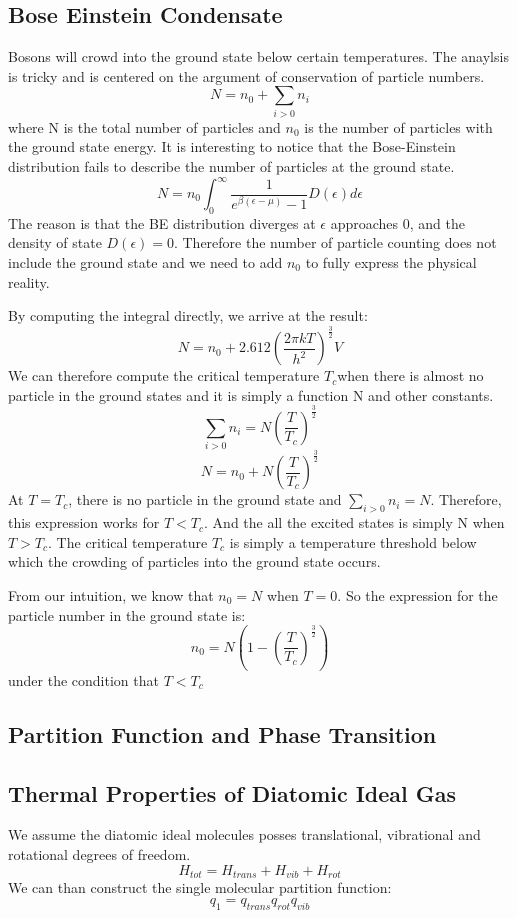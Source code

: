 \documentclass[12pt, oneside]{article}   	%
\begin{document}
\subsection{Bose Einstein Condensate}
\par 
Bosons will crowd into the ground state below certain temperatures. The anaylsis is tricky and is centered on the argument of conservation of particle numbers. 
$$N = n_0 + \sum_{i > 0} n_i $$
where N is the total number of particles and $n_0$ is the number of particles with the ground state energy. It is interesting to notice that the Bose-Einstein distribution fails to describe the number of particles at the ground state. 
$$N = n_0 \int_0^{\infty} \frac{1}{e^{\beta (\epsilon - \mu)} -1} D(\epsilon) d\epsilon$$
The reason is that the BE distribution diverges at $\epsilon$ approaches 0, and the density of state $D(\epsilon) = 0$. Therefore the number of particle counting does not include the ground state and we need to add $n_0$ to fully express the physical reality. 
\par 
By computing the integral directly, we arrive at the result: 
$$N = n_0 + 2.612 (\frac{2\pi k T}{h^2})^{\frac{3}{2}} V $$
We can therefore compute the critical temperature $T_c$when there is almost no particle in the ground states and it is simply a function N and other constants.
$$ \sum_{i > 0} n_i  =  N(\frac{T}{T_c})^{\frac{3}{2}}$$
$$N = n_0 + N(\frac{T}{T_c})^{\frac{3}{2}}$$
At $T=T_c$, there is no particle in the ground state and $ \sum_{i > 0} n_i  = N$. Therefore, this expression works for $T < T_c$. And the all the excited states is simply N when $T > T_c$. The critical temperature $T_c$ is simply a temperature threshold below which the crowding of particles into the ground state occurs. 
\par
From our intuition, we know that $n_0 = N$ when $T = 0$. So the expression for the particle number in the ground state is:
$$n_0  = N(1 - (\frac{T}{T_c})^{\frac{3}{2}})$$ 
under the condition that $T < T_c$

\subsection{Partition Function and Phase Transition}

\subsection{Thermal Properties of Diatomic Ideal Gas} 
\par 
We assume the diatomic ideal molecules posses translational, vibrational and rotational degrees of freedom. 
$$H_{tot} = H_{trans} + H_{vib} + H_{rot}$$
We can than construct the single molecular partition function: 
$$q_1 = q_{trans} q_{rot} q_{vib}$$
\end{document}

